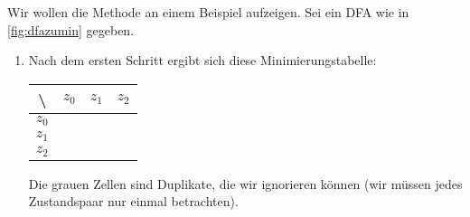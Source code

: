 Wir wollen die Methode an einem Beispiel aufzeigen.
Sei ein DFA wie in \autoref{fig:dfazumin} gegeben.
\begin{enumerate}
    \item Nach dem ersten Schritt ergibt sich diese Minimierungstabelle: 
        \begin{table}[H]
            \centering
            \begin{tabular}{|c|c|c|c|}
            \hline
                \textbackslash  & $z_0$   & $z_1$               & $z_2$ \\ \hline
                $z_0$           &         & \cellcolor{gray}    & \cellcolor{gray} \\ \hline
                $z_1$           &         &                     & \cellcolor{gray} \\ \hline
                $z_2$           &         &                     & \\ \hline
            \end{tabular}
            \label{tab:mintab1}
        \end{table}
        Die grauen Zellen sind Duplikate,
        die wir ignorieren können (wir müssen jedes Zustandspaar nur einmal betrachten).


\end{enumerate}
